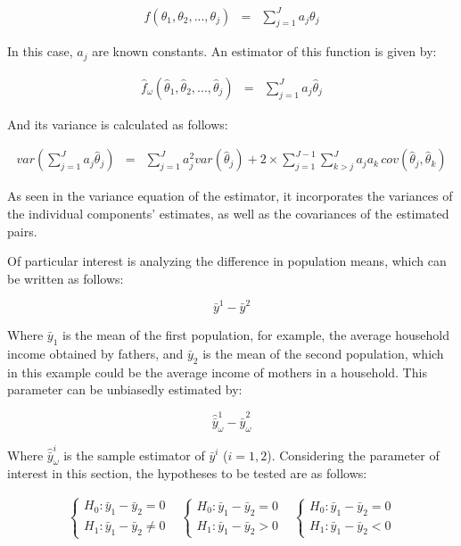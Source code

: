 \documentclass[
  12pt,
]{book}
\begin{document}
\begin{eqnarray*}
f\left(\theta_{1},\theta_{2},...,\theta_{j}\right) & = & \sum_{j=1}^{J}a_{j}\theta_{j}
\end{eqnarray*}

In this case, \(a_{j}\) are known constants. An estimator of this function is given by:

\begin{eqnarray}
\hat{f}_{\omega}\left(\hat{\theta}_{1},\hat{\theta}_{2},...,\hat{\theta}_{j}\right) & = & \sum_{j=1}^{J}a_{j}\hat{\theta}_{j}
\end{eqnarray}

And its variance is calculated as follows:

\begin{eqnarray}
var\left(\sum_{j=1}^{J}a_{j}\hat{\theta}_{j}\right) & = & \sum_{j=1}^{J}a_{j}^{2}var\left(\hat{\theta}_{j}\right)+2\times\sum_{j=1}^{J-1}\sum_{k>j}^{J}a_{j}a_{k}\,cov\left(\hat{\theta}_{j},\hat{\theta}_{k}\right)
\end{eqnarray}

As seen in the variance equation of the estimator, it incorporates the variances of the individual components' estimates, as well as the covariances of the estimated pairs.

Of particular interest is analyzing the difference in population means, which can be written as follows:

\[
\bar{y}^{1}-\bar{y}^{2}
\]

Where \(\bar{y}_{1}\) is the mean of the first population, for example, the average household income obtained by fathers, and \(\bar{y}_{2}\) is the mean of the second population, which in this example could be the average income of mothers in a household. This parameter can be unbiasedly estimated by:

\[
\hat{\bar{y}}_{\omega}^{1}-\hat{\bar{y}}_{\omega}^{2}
\]

Where \(\hat{\bar{y}}_{\omega}^{i}\) is the sample estimator of \(\bar{y}^{i}\) (\(i = 1, 2\)). Considering the parameter of interest in this section, the hypotheses to be tested are as follows:

\begin{eqnarray*}
\begin{cases}
H_{0}:\bar{y}_{1}-\bar{y}_{2}=0\\
H_{1}:\bar{y}_{1}-\bar{y}_{2}\neq0
\end{cases} & \begin{cases}
H_{0}:\bar{y}_{1}-\bar{y}_{2}=0\\
H_{1}:\bar{y}_{1}-\bar{y}_{2}>0
\end{cases} & \begin{cases}
H_{0}:\bar{y}_{1}-\bar{y}_{2}=0\\
H_{1}:\bar{y}_{1}-\bar{y}_{2}<0
\end{cases}
\end{eqnarray*}
\end{document}
